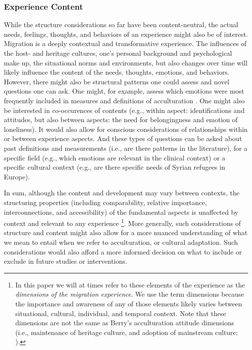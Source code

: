 \documentclass[man, 12pt, a4paper]{apa7}
\begin{document}
\subsubsection{Experience Content}
While the structure considerations so far have been content-neutral, the actual needs, feelings, thoughts, and behaviors of an experience might also be of interest. Migration is a deeply contextual and transformative experience. The influences of the host- and heritage cultures, one's personal background and psychological make up, the situational norms and environments, but also changes over time will likely influence the content of the needs, thoughts, emotions, and behaviors. 
However, there might also be structural patterns one could assess and novel questions one can ask. One might, for example, assess which emotions were most frequently included in measures and definitions of acculturation \citep[e.g., specific emotions such as anger or pride, but also types of emotions, such as positive or negative, or about yourself or others;][]{DeLeersnyder2017}. One might also be interested in co-occurences of contents (e.g., within aspect: identifications and attitudes, but also between aspects: the need for belongingness and emotion of loneliness). It would also allow for conscious considerations of relationships within or between experience aspects. And these types of questions can be asked about past definitions and measurements (i.e., are there patterns in the literature), for a specific field (e.g., which emotions are relevant in the clinical context) or a specific cultural context (e.g., are there specific needs of Syrian refugees in Europe). 

In sum, although the content and development may vary between contexts, the structuring properties (including comparability, relative importance, interconnections, and accessibility) of the fundamental aspects is unaffected by context and relevant to any experience \citep[also see][for a discussion of the distinction between \textit{universalism} and \textit{absolutism}]{Berry2000, Berry2009a}\footnote{In this paper we will at times refer to these elements of the experience as the \textit{dimensions of the migration experience}. We use the term dimensions because the importance and awareness of any of those elements likely varies between situational, cultural, individual, and temporal context. Note that these dimensions are not the same as Berry's acculturation attitude dimensions (i.e., maintenance of heritage culture, and adoption of mainstream culture; \citealp[e.g.,][]{Berry1989}).}.
More generally, such considerations of structure and content might also allow for a more nuanced understanding of what we mean to entail when we refer to acculturation, or cultural adaptation. Such considerations would also afford a more informed decision on what to include or exclude in future studies or interventions.
\end{document}
